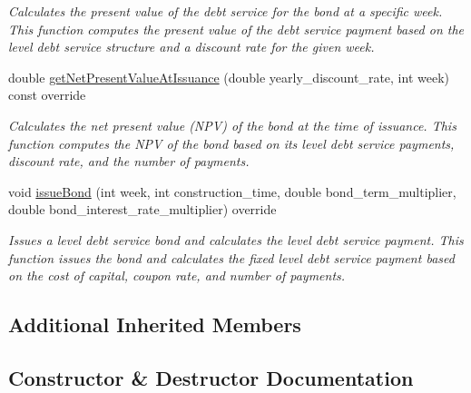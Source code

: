 \begin{DoxyCompactItemize}
\begin{DoxyCompactList}\small\item\em Calculates the present value of the debt service for the bond at a specific week. This function computes the present value of the debt service payment based on the level debt service structure and a discount rate for the given week. \end{DoxyCompactList}\item 
double \mbox{\hyperlink{classLevelDebtServiceBond_a0f5820c3e76b8b908dbe153a8291d96a}{get\+Net\+Present\+Value\+At\+Issuance}} (double yearly\+\_\+discount\+\_\+rate, int week) const override
\begin{DoxyCompactList}\small\item\em Calculates the net present value (N\+PV) of the bond at the time of issuance. This function computes the N\+PV of the bond based on its level debt service payments, discount rate, and the number of payments. \end{DoxyCompactList}\item 
void \mbox{\hyperlink{classLevelDebtServiceBond_a51a54a1a25be105b168bf86489aee417}{issue\+Bond}} (int week, int construction\+\_\+time, double bond\+\_\+term\+\_\+multiplier, double bond\+\_\+interest\+\_\+rate\+\_\+multiplier) override
\begin{DoxyCompactList}\small\item\em Issues a level debt service bond and calculates the level debt service payment. This function issues the bond and calculates the fixed level debt service payment based on the cost of capital, coupon rate, and number of payments. \end{DoxyCompactList}\end{DoxyCompactItemize}
\subsection*{Additional Inherited Members}


\subsection{Constructor \& Destructor Documentation}
\mbox{\label{classLevelDebtServiceBond_a71af87d057090bd2310a10df03b36fdf}} 

